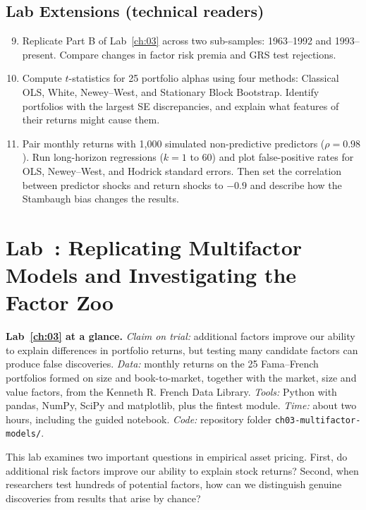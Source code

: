 \subsection*{Lab Extensions (technical readers)}
\begin{enumerate}
  \setcounter{enumi}{8}
  \item Replicate Part B of Lab~\ref{ch:03} across two sub-samples: 1963--1992 and 1993--present. Compare changes in factor risk premia and GRS test rejections.
  \item Compute $t$-statistics for 25 portfolio alphas using four methods: Classical OLS, White, Newey--West, and Stationary Block Bootstrap. Identify portfolios with the largest SE discrepancies, and explain what features of their returns might cause them.
  \item Pair monthly returns with 1,000 simulated non-predictive predictors ($\rho = 0.98$). Run long-horizon regressions ($k=1$ to $60$) and plot false-positive rates for OLS, Newey--West, and Hodrick standard errors. Then set the correlation between predictor shocks and return shocks to $-0.9$ and describe how the Stambaugh bias changes the results.
\end{enumerate}

\section{Lab~\thechapter: Replicating Multifactor Models and Investigating the Factor Zoo}
\label{sec:03-lab}

\begin{callout}
\textbf{Lab~\ref{ch:03} at a glance.} \emph{Claim on trial:} additional factors improve our ability to explain differences in portfolio returns, but testing many candidate factors can produce false discoveries. \emph{Data:} monthly returns on the 25 Fama--French portfolios formed on size and book-to-market, together with the market, size and value factors, from the Kenneth R. French Data Library. \emph{Tools:} Python with pandas, NumPy, SciPy and matplotlib, plus the fintest module. \emph{Time:} about two hours, including the guided notebook. \emph{Code:} repository folder \texttt{ch03-multifactor-models/}.
\end{callout}

This lab examines two important questions in empirical asset pricing. First, do additional risk factors improve our ability to explain stock returns? Second, when researchers test hundreds of potential factors, how can we distinguish genuine discoveries from results that arise by chance?

